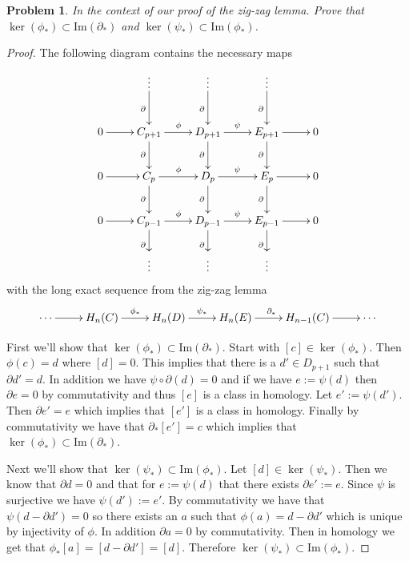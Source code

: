 \documentclass[10pt]{article}
\theoremstyle{plain}
\newtheorem{problem}{Problem}
\theoremstyle{remark}
\begin{document}
\begin{problem}
  In the context of our proof of the zig-zag lemma.
  Prove that $\ker(\phi_\ast) \subset \mathrm{Im}(\partial_\ast)$ and $\ker(\psi_\ast) \subset \mathrm{Im}(\phi_\ast)$.
\end{problem}

\begin{proof}
  The following diagram contains the necessary maps
  \[
    \xymatrix{
      & \vdots \ar[d]_\partial & \vdots \ar[d]_\partial & \vdots \ar[d]_\partial & \\
      0 \ar[r] & C_{p+1} \ar[r]^\phi \ar[d]_\partial & D_{p+1} \ar[r]^{\psi}\ar[d]_\partial
      & E_{p+1}  \ar[d]_\partial \ar[r] & 0\\
      0 \ar[r] & C_{p} \ar[r]^\phi \ar[d]_\partial & D_{p} \ar[r]^{\psi}\ar[d]_\partial
      & E_{p}  \ar[d]_\partial \ar[r] & 0\\
      0 \ar[r] & C_{p-1} \ar[r]^\phi \ar[d]_\partial & D_{p-1} \ar[r]^{\psi}\ar[d]_\partial
      & E_{p-1}  \ar[d]_\partial \ar[r] & 0\\
      & \vdots & \vdots & \vdots &
    }
  \]
  with the long exact sequence from the zig-zag lemma
  \[
    \xymatrix{
      \cdots \ar[r] & H_n(C) \ar[r]^{\phi_*} & H_n(D) \ar[r]^{\psi_*} & H_n(E) \ar[r]^{\partial_*}
      & H_{n-1}(C)\ar[r] & \cdots
    }
  \]

  First we'll show that $\ker(\phi_*)\subset\mathrm{Im}(\partial_*)$. Start with $[c]\in\ker(\phi_*)$.
  Then $\phi(c)=d$ where $[d]=0$. This implies that there is a $d'\in D_{p+1}$ such
  that $\partial d'=d$. In addition we have $\psi\circ\partial(d)=0$ and if we have $e:=\psi(d)$ then
  $\partial e =0$ by commutativity and thus $[e]$ is a class in homology. Let
  $e':=\psi(d')$. Then $\partial e' = e$ which implies that $[e']$ is a class in homology.
  Finally by commutativity we have that $\partial_*[e']=c$ which implies that
  $\ker(\phi_*)\subset\mathrm{Im}(\partial_*)$.

  Next we'll show that $\ker(\psi_*)\subset\mathrm{Im}(\phi_*)$. Let $[d]\in \ker(\psi_*)$. Then
  we know that $\partial d=0$ and that for $e:=\psi(d)$ that there exists $\partial e':= e$.
  Since $\psi$ is surjective we have $\psi(d'):=e'$. By commutativity we have
  that $\psi(d-\partial d')=0$ so there exists an $a$ such that $\phi(a)=d-\partial d'$ which is
  unique by injectivity of $\phi$. In addition $\partial a=0$ by commutativity.
  Then in homology we get that $\phi_*[a] = [d-\partial d']=[d]$. Therefore
  $\ker(\psi_*)\subset\mathrm{Im}(\phi_*)$.
\end{proof}
\end{document}
